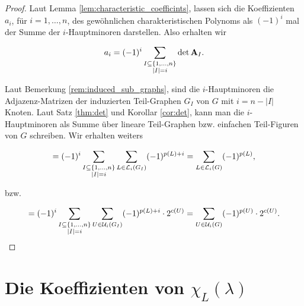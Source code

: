         \begin{proof}

            Laut Lemma \ref{lem:characteristic_coefficints}, lassen sich die Koeffizienten $a_i$, für $i = 1, \dots, n$, des gewöhnlichen charakteristischen Polynoms als $(-1)^i$ mal der Summe der $i$-Hauptminoren darstellen.
            Also erhalten wir

            \begin{align*}
                a_i
                =
                (-1)^i
                \sum_{\substack{I \subseteq {\left \{ 1, \dots, n \right \}} \\ |I| = i}}
                    \det \mathbf A_I.
            \end{align*}

            Laut Bemerkung \ref{rem:induced_sub_graphs}, sind die $i$-Hauptminoren die Adjazenz-Matrizen der induzierten Teil-Graphen $G_I$ von $G$ mit $i = n - |I|$ Knoten.
            Laut Satz \ref{thm:det} und Korollar \ref{cor:det}, kann man die $i$-Hauptminoren als Summe über lineare Teil-Graphen bzw. einfachen Teil-Figuren von $G$ schreiben.
            Wir erhalten weiters

            \begin{align*}
                =
                (-1)^i
                \sum_{\substack{I \subseteq {\left \{ 1, \dots, n \right \}} \\ |I| = i}}
                    \sum_{L \in \mathcal L_i(G_I)}
                        (-1)^{p(L) + i}
                =
                \sum_{L \in \mathcal L_i(G)} (-1)^{p(L)},
            \end{align*}

            bzw.

            \begin{align*}
                =
                (-1)^i
                \sum_{\substack{I \subseteq {\left \{ 1, \dots, n \right \}} \\ |I| = i}}
                    \sum_{U \in \mathcal U_i(G_I)}
                        (-1)^{p(L) + i} \cdot 2^{c(U)}
                =
                \sum_{U \in \mathcal U_i(G)} (-1)^{p(U)} \cdot 2^{c(U)}.
            \end{align*}

        \end{proof}

    \section{Die Koeffizienten von $\chi_L(\lambda)$}

